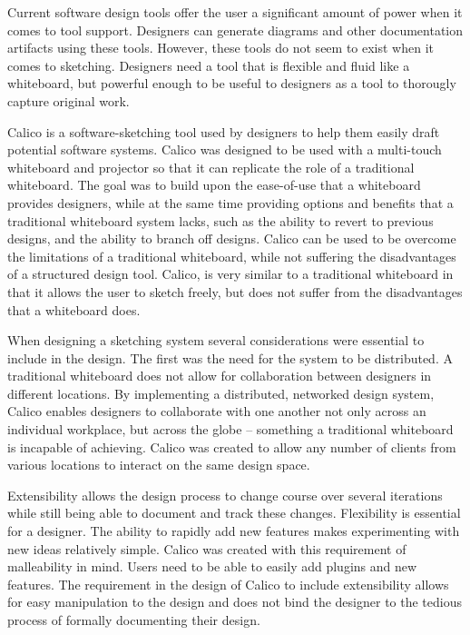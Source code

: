 Current software design tools offer the user a significant amount of power when it comes to tool support. Designers can generate diagrams and other documentation artifacts using these tools. However, these tools do not seem to exist when it comes to sketching. Designers need a tool that is flexible and fluid like a whiteboard, but powerful enough to be useful to designers as a tool to thorougly capture original work.  

Calico is a software-sketching tool used by designers to help them easily draft potential software systems. Calico was designed to be used with a multi-touch whiteboard and projector so that it can replicate the role of a traditional whiteboard. The goal was to build upon the ease-of-use that a whiteboard provides designers, while at the same time providing options and benefits that a traditional whiteboard system lacks, such as the ability to revert to previous designs, and the ability to branch off designs. Calico can be used to be overcome the limitations of a traditional whiteboard, while not suffering the disadvantages of a structured design tool. Calico, is very similar to a traditional whiteboard in that it allows the user to sketch freely, but does not suffer from the disadvantages that a whiteboard does. 

When designing a sketching system several considerations were essential to include in the design. The first was the need for the system to be distributed. A traditional whiteboard does not allow for collaboration between designers in different locations. By implementing a distributed, networked design system, Calico enables designers to collaborate with one another not only across an individual workplace, but across the globe -- something a traditional whiteboard is incapable of achieving. Calico was created to allow any number of clients from various locations to interact on the same design space.

Extensibility allows the design process to change course over several iterations while still being able to document and track these changes. Flexibility is essential for a designer. The ability to rapidly add new features makes experimenting with new ideas relatively simple. Calico was created with this requirement of malleability in mind. Users need to be able to easily add plugins and new features.
The requirement in the design of Calico to include extensibility allows for easy manipulation to the design and does not bind the designer to the tedious process of formally documenting their design.

